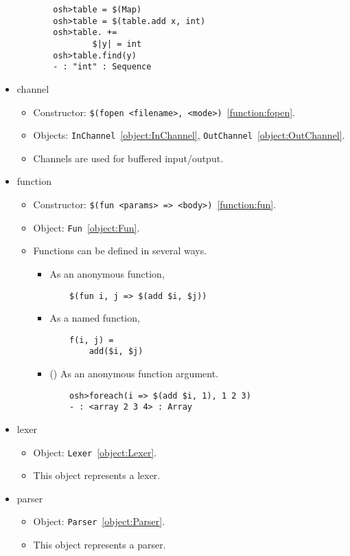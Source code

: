\begin{itemize}
\begin{itemize}
\begin{verbatim}
    osh>table = $(Map)
    osh>table = $(table.add x, int)
    osh>table. +=
            $|y| = int
    osh>table.find(y)
    - : "int" : Sequence
\end{verbatim}
\end{itemize}

\item channel

\begin{itemize}
\item Constructor: \verb+$(fopen <filename>, <mode>)+~\ref{function:fopen}.
\item Objects: \verb+InChannel+~\ref{object:InChannel}, \verb+OutChannel+~\ref{object:OutChannel}.
\item Channels are used for buffered input/output.
\end{itemize}

\item function

\begin{itemize}
\item Constructor: \verb+$(fun <params> => <body>)+~\ref{function:fun}.
\item Object: \verb+Fun+~\ref{object:Fun}.
\item Functions can be defined in several ways.
\begin{itemize}
\item As an anonymous function,
\begin{verbatim}
    $(fun i, j => $(add $i, $j))
\end{verbatim}
\item As a named function,
\begin{verbatim}
    f(i, j) =
        add($i, $j)
\end{verbatim}
\item
(\newinkeyword)
As an anonymous function argument.
\begin{verbatim}
    osh>foreach(i => $(add $i, 1), 1 2 3)
    - : <array 2 3 4> : Array
\end{verbatim}
\end{itemize}
\end{itemize}

\item lexer

\begin{itemize}
\item Object: \verb+Lexer+~\ref{object:Lexer}.
\item This object represents a lexer.
\end{itemize}

\item parser

\begin{itemize}
\item Object: \verb+Parser+~\ref{object:Parser}.
\item This object represents a parser.
\end{itemize}
\end{itemize}

